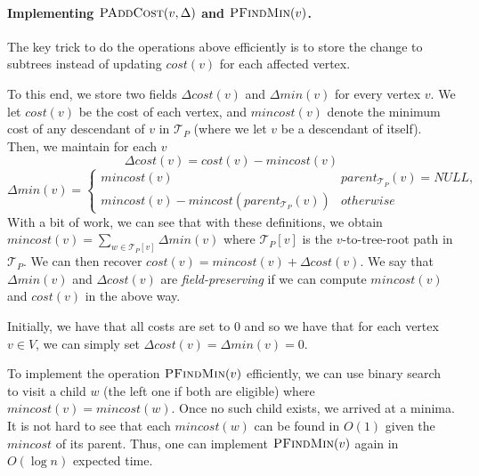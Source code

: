 \paragraph{Implementing $\textsc{PAddCost}(v, \Delta)$ and $\textsc{PFindMin}(v)$.} The key trick to do the operations above efficiently is to store the change to subtrees instead of updating $cost(v)$ for each affected vertex. 

To this end, we store two fields $\Delta cost(v)$ and $\Delta min(v)$ for every vertex $v$. We let $cost(v)$ be the cost of each vertex, and $mincost(v)$ denote the minimum cost of any descendant of $v$ in $\mathcal{T}_{P}$ (where we let $v$ be a descendant of itself). Then, we maintain for each $v$
\[
    \Delta cost(v) = cost(v) - mincost(v)
\]
\[
    \Delta min(v) = \begin{cases}
    mincost(v) & parent_{\mathcal{T}_{P}}(v) = NULL, \\
    mincost(v) - mincost(parent_{\mathcal{T}_{P}}(v)) & otherwise\end{cases}
\]
With a bit of work, we can see that with these definitions, we obtain $mincost(v) = \sum_{w \in \mathcal{T}_{P}[v]} \Delta min(v)$ where $\mathcal{T}_{P}[v]$ is the $v$-to-tree-root path in $\mathcal{T}_{P}$. We can then recover $cost(v) = mincost(v) + \Delta cost(v)$. We say that $\Delta min(v)$ and $\Delta cost(v)$ are \emph{field-preserving} if we can compute $mincost(v)$ and $cost(v)$ in the above way. 

Initially, we have that all costs are set to $0$ and so we have that for each vertex $v \in V$, we can simply set $\Delta cost(v) = \Delta min(v) = 0$. 

To implement the operation $\textsc{PFindMin}(v)$ efficiently, we can use binary search to visit a child $w$ (the left one if both are eligible) where $mincost(v) = mincost(w)$. Once no such child exists, we arrived at a minima. It is not hard to see that each $mincost(w)$ can be found in $O(1)$ given the $mincost$ of its parent. Thus, one can implement $\textsc{PFindMin}(v)$ again in $O(\log n)$ expected time. 

